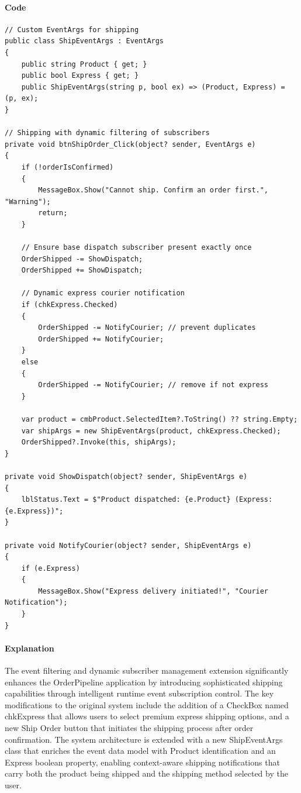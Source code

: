 \paragraph{Code}
\begin{lstlisting}[language=CSharp, caption={Complete Shipping and Dynamic Subscription Implementation}]
// Custom EventArgs for shipping
public class ShipEventArgs : EventArgs
{
    public string Product { get; }
    public bool Express { get; }
    public ShipEventArgs(string p, bool ex) => (Product, Express) = (p, ex);
}

// Shipping with dynamic filtering of subscribers
private void btnShipOrder_Click(object? sender, EventArgs e)
{
    if (!orderIsConfirmed)
    {
        MessageBox.Show("Cannot ship. Confirm an order first.", "Warning");
        return;
    }
    
    // Ensure base dispatch subscriber present exactly once
    OrderShipped -= ShowDispatch;
    OrderShipped += ShowDispatch;
    
    // Dynamic express courier notification
    if (chkExpress.Checked)
    {
        OrderShipped -= NotifyCourier; // prevent duplicates
        OrderShipped += NotifyCourier;
    }
    else
    {
        OrderShipped -= NotifyCourier; // remove if not express
    }
    
    var product = cmbProduct.SelectedItem?.ToString() ?? string.Empty;
    var shipArgs = new ShipEventArgs(product, chkExpress.Checked);
    OrderShipped?.Invoke(this, shipArgs);
}

private void ShowDispatch(object? sender, ShipEventArgs e)
{
    lblStatus.Text = $"Product dispatched: {e.Product} (Express: {e.Express})";
}

private void NotifyCourier(object? sender, ShipEventArgs e)
{
    if (e.Express)
    {
        MessageBox.Show("Express delivery initiated!", "Courier Notification");
    }
}
\end{lstlisting}

\paragraph{Explanation}
The event filtering and dynamic subscriber management extension significantly enhances the OrderPipeline application by introducing sophisticated shipping capabilities through intelligent runtime event subscription control. The key modifications to the original system include the addition of a CheckBox named chkExpress that allows users to select premium express shipping options, and a new Ship Order button that initiates the shipping process after order confirmation. The system architecture is extended with a new ShipEventArgs class that enriches the event data model with Product identification and an Express boolean property, enabling context-aware shipping notifications that carry both the product being shipped and the shipping method selected by the user.

